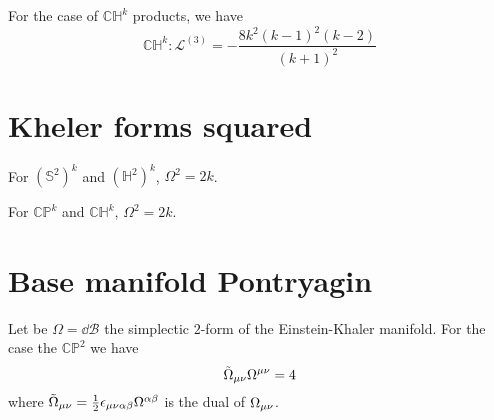 For the case of $\mathbb{CH}^k$ products, we have
\begin{equation}
    \mathbb{CH}^k:\mathcal{L}^{(3)}=-\frac{8k^2(k-1)^2(k-2)}{(k+1)^2}
\end{equation}





\section{Kheler forms squared}
For $(\mathbb{S}^2)^k$ and $(\mathbb{H}^2)^k$, $\Omega^2=2k$.

For $\mathbb{CP}^k$ and $\mathbb{CH}^k$, $\Omega^2=2k$.

\section{Base manifold Pontryagin}
Let be $\Omega=\dd \mathcal{B}$ the simplectic $2$-form of the Einstein-Khaler manifold. For the case the $\mathbb{CP}^2$ we have
\begin{equation}
	\tilde{\Omega}_{\mu\nu}\Omega^{\mu\nu }=4
\end{equation}
where $\tilde{\Omega}_{\mu\nu}=\frac{1}{2}\epsilon_{\mu\nu \alpha\beta}\Omega^{\alpha\beta }$ is the dual of $\Omega_{\mu\nu }$.
































